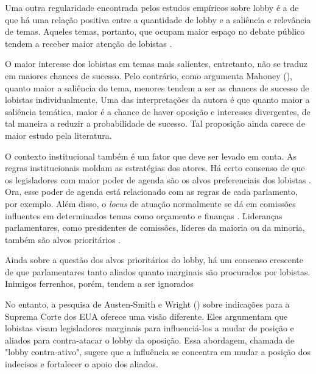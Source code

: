 Uma outra regularidade encontrada pelos estudos empíricos sobre lobby é a de que há uma relação positiva entre a quantidade de lobby e a saliência e relevância de temas. Aqueles temas, portanto, que ocupam maior espaço no debate público tendem a receber maior atenção de lobistas \cite{caldeira2000lobbying,  baumgartner2010agendas, bonardi2005corporate}.

O maior interesse dos lobistas em temas mais salientes, entretanto, não se traduz em maiores chances de sucesso. Pelo contrário, como argumenta Mahoney (\citeyear{mahoney_lobbying_2007}), quanto maior a saliência do tema, menores tendem a ser as chances de sucesso de lobistas individualmente. Uma das interpretações da autora é que quanto maior a saliência temática, maior é a chance de haver oposição e interesses divergentes, de tal maneira a reduzir a probabilidade de sucesso. Tal proposição ainda carece de maior estudo pela literatura.

O contexto institucional também é um fator que deve ser levado em conta. As regras institucionais moldam as estratégias dos atores. Há certo consenso de que os legisladores com maior poder de agenda são os alvos preferenciais dos lobistas \cite{de_figueiredo_advancing_2014}. Ora, esse poder de agenda está relacionado com as regras de cada parlamento, por exemplo. Além disso, o \textit{locus} de atuação normalmente se dá em comissões influentes em determinados temas como orçamento e finanças \cite{hojnacki2001pac, drope2004purchasing}. Lideranças parlamentares, como presidentes de comissões, líderes da maioria ou da minoria, também são alvos prioritários \cite{evans1996before}.

Ainda sobre a questão dos alvos prioritários do lobby, há um consenso crescente de que parlamentares tanto aliados \cite{kollman1998outside, caldeira2000lobbying, hojnacki2001pac} quanto marginais \cite{holyoke2003choosing, kelleher2009political, bertrand2014whom, gawande2012lobbying} são procurados por lobistas. Inimigos ferrenhos, porém, tendem a ser ignorados  \cite{de_figueiredo_advancing_2014}

No entanto, a pesquisa de Austen-Smith e Wright (\citeyear{austen1996theory}) sobre indicações para a Suprema Corte dos EUA oferece uma visão diferente. Eles argumentam que lobistas visam legisladores marginais para influenciá-los a mudar de posição e aliados para contra-atacar o lobby da oposição. Essa abordagem, chamada de "lobby contra-ativo", sugere que a influência se concentra em mudar a posição dos indecisos e fortalecer o apoio dos aliados.

